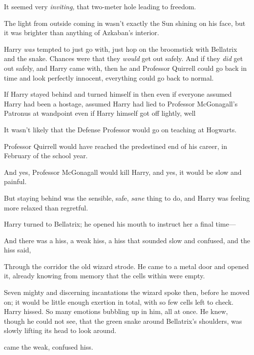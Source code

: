 It seemed very{\el} \emph{inviting,} that two-meter hole leading to freedom.

The light from outside coming in{\el} wasn't exactly the Sun shining on his
face, but it was brighter than anything of Azkaban's interior.

Harry \emph{was} tempted to just go with, just hop on the broomstick with
Bellatrix and the snake. Chances were that they \emph{would} get out safely.
And if they \emph{did} get out safely, and Harry came with, then he and
Professor Quirrell could go back in time and look perfectly innocent,
everything could go back to normal.

If Harry stayed behind and turned himself in{\el} then even if everyone
assumed Harry had been a hostage, assumed Harry had lied to Professor
McGonagall's Patronus at wandpoint{\el} even if Harry himself got off
lightly, well{\el}

It wasn't likely that the Defense Professor would go on teaching at Hogwarts.

Professor Quirrell would have reached the predestined end of his career, in
February of the school year.

And yes, Professor McGonagall would kill Harry, and yes, it would be slow and
painful.

But staying behind was the sensible, safe, \emph{sane} thing to do, and Harry
was feeling more relaxed than regretful.

Harry turned to Bellatrix; he opened his mouth to instruct her a final time---

And there was a hiss, a weak hiss, a hiss that sounded slow and confused, and
the hiss said,

\sbreak
Through the corridor the old wizard strode. He came to a metal door and opened
it, already knowing from memory that the cells within were empty.

Seven mighty and discerning incantations the wizard spoke then, before he moved
on; it would be little enough exertion in total, with so few cells left to
check.
\sbreak
{} Harry hissed. So many emotions bubbling up in him, all at
once. He knew, though he could not see, that the green snake around Bellatrix's
shoulders, was slowly lifting its head to look around. 

 came the weak, confused hiss. 


